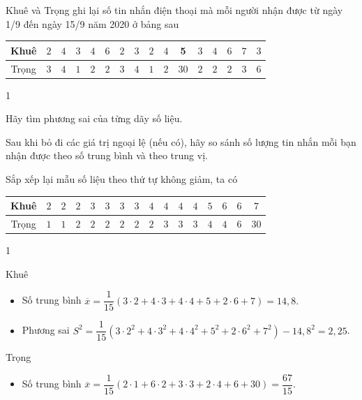 \begin{bt}%
	Khuê và Trọng ghi lại số tin nhắn điện thoại mà mỗi người nhận được từ ngày 1/9 đến ngày 15/9 năm 2020 ở bảng sau
	\begin{center}
		\begin{tabular}{|c|c|c|c|c|c|c|c|c|c|c|c|c|c|c|c|}
			\hline Khuê & $2$ & $4$ & $3$ & $4$ & $6$ & $2$& $3$ & $2$ & $4$& 5 & $3$ & $4$ & $6$ & $7$ & $3$ \\
			\hline Trọng & $3$ & $4$ & $1$ & $2$ & $2$ & $3$ & $4$ & $1$ & $2$ & $30$ & $2$ & $2$ & $2$ &$3$ & $6$ \\
			\hline
		\end{tabular}
	\end{center}
	\begin{enumEX}[a)]{1}
		\item Hãy tìm phương sai của từng dãy số liệu.
		\item Sau khi bỏ đi các giá trị ngoại lệ (nếu có), hãy so sánh số lượng tin nhắn mỗi bạn nhận được theo số trung bình và theo trung vị.
	\end{enumEX}
	\loigiai
	{  Sắp xếp lại mẫu số liệu theo thứ tự không giảm, ta có 
		\begin{center}
			\begin{tabular}{|c|c|c|c|c|c|c|c|c|c|c|c|c|c|c|c|}
				\hline Khuê & $2$ & $2$ & $2$ & $3$ & $3$ & $3$& $3$ & $4$ & $4$& $4$ & $4$ & $5$ & $6$ & $6$ & $7$ \\
				\hline Trọng & $1$ & $1$ & $2$ & $2$ & $2$ & $2$ & $2$ & $2$ & $3$ & $3$ & $3$ & $4$ &$4$ & $6$ & $30$ \\
				\hline
			\end{tabular}
		\end{center}
		\begin{enumEX}[a)]{1}
			\item Khuê
			\begin{itemize}
				\item Số trung bình $\overline{x}=\dfrac{1}{15}\left(3\cdot 2+4\cdot 3+4\cdot 4+5+2\cdot 6+7\right)=14{,}8.$
				\item Phương sai  $S^2=\dfrac{1}{15}\left(3\cdot 2^2+4\cdot 3^2+4\cdot 4^2+5^2+2\cdot 6^2+7^2\right)-14{,}8^2=2{,}25$.
			\end{itemize}
			Trọng
			\begin{itemize}
				\item Số trung bình $\overline{x}=\dfrac{1}{15}\left(2\cdot 1+6\cdot 2+3\cdot 3+2\cdot 4+6+30\right)=\dfrac{67}{15}.$

\end{itemize}
\end{enumEX}}
\end{bt}
